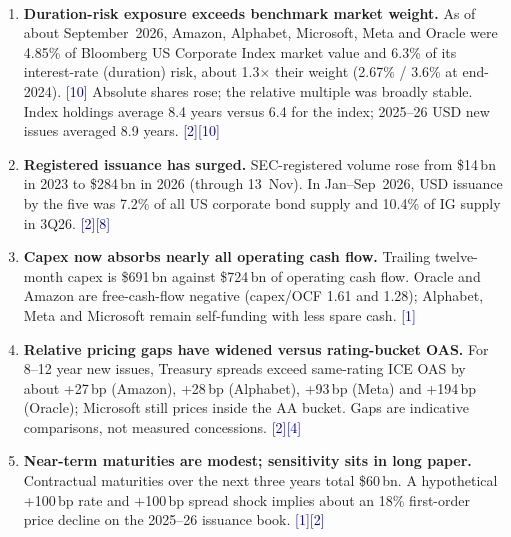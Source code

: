 \documentclass[10pt,letterpaper]{article}
\newcommand{\src}[1]{{\scriptsize\textcolor{navy}{[#1]}}}
\newcommand{\thinrule}{\noindent{\color{lightline}\rule{\textwidth}{0.4pt}}\par}
\begin{document}
\vspace{0.75em}
\\[-0.42em]
\thinrule
\vspace{0.28em}
\begin{enumerate}[leftmargin=1.2em,itemsep=0.2em,parsep=0em,topsep=0em,label={\footnotesize\textcolor{navy}{\textbf{\arabic*.}}}]
  \item {\small\textbf{Duration-risk exposure exceeds benchmark market weight.} As of about September~2026, Amazon, Alphabet, Microsoft, Meta and Oracle were 4.85\% of Bloomberg US Corporate Index market value and 6.3\% of its interest-rate (duration) risk, about 1.3$\times$ their weight (2.67\% / 3.6\% at end-2024). \src{10} Absolute shares rose; the relative multiple was broadly stable. Index holdings average 8.4 years versus 6.4 for the index; 2025--26 USD new issues averaged 8.9 years. \src{2}\src{10}}
  \item {\small\textbf{Registered issuance has surged.} SEC-registered volume rose from \$14\,bn in 2023 to \$284\,bn in 2026 (through 13~Nov). In Jan--Sep~2026, USD issuance by the five was 7.2\% of all US corporate bond supply and 10.4\% of IG supply in 3Q26. \src{2}\src{8}}
  \item {\small\textbf{Capex now absorbs nearly all operating cash flow.} Trailing twelve-month capex is \$691\,bn against \$724\,bn of operating cash flow. Oracle and Amazon are free-cash-flow negative (capex/OCF 1.61 and 1.28); Alphabet, Meta and Microsoft remain self-funding with less spare cash. \src{1}}
  \item {\small\textbf{Relative pricing gaps have widened versus rating-bucket OAS.} For 8--12 year new issues, Treasury spreads exceed same-rating ICE OAS by about +27\,bp (Amazon), +28\,bp (Alphabet), +93\,bp (Meta) and +194\,bp (Oracle); Microsoft still prices inside the AA bucket. Gaps are indicative comparisons, not measured concessions. \src{2}\src{4}}
  \item {\small\textbf{Near-term maturities are modest; sensitivity sits in long paper.} Contractual maturities over the next three years total \$60\,bn. A hypothetical +100\,bp rate and +100\,bp spread shock implies about an 18\% first-order price decline on the 2025--26 issuance book. \src{1}\src{2}}
\end{enumerate}

\clearpage
{}

\end{document}

